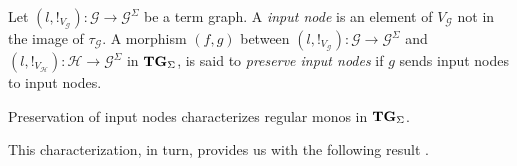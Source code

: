 \documentclass[3p]{elsarticle}
\newcommand{\catname}[1]{\textbf{\textup{#1}}}
\newcommand{\hyp}{\catname{Hyp}}
\newcommand{\tg}[0]{\catname{TG}_{\Sigma}}
\newcommand{\commentato}[1]{ {} }
\theoremstyle{remark}
\theoremstyle{definition}
\begin{document}
\begin{defi}
	Let $(l, !_{V_{\mathcal{G}}})\colon \mathcal{G}\to \mathcal{G}^{\Sigma}$  be a term graph. A \emph{input node} is an element of $V_{\mathcal{G}}$ not in the image of $\tau_{\mathcal{G}}$.  A morphism $(f,g)$ between
	 $(l, !_{V_{\mathcal{G}}})\colon \mathcal{G}\to \mathcal{G}^{\Sigma}$ and $(l, !_{V_{\mathcal{H}}})\colon \mathcal{H}\to \mathcal{G}^{\Sigma}$ in $\tg$, is said to \emph{preserve input nodes} if $g$ sends input nodes to input nodes.
\end{defi}

\commentato{
\todo{Se questo remark sotto non serve nel pezzo sulle equivalenze possiamo toglierlo}
\begin{rem}\label{prop:image}
	Suppose that $(f,g)\colon (l, !_{V_{\mathcal{G}}})\to (l', !_{V_{\mathcal{H}}})$ preserves input nodes. Then  if $\tau_{\mathcal{H}}(h)=g(v)$ for some $v\in V_{\mathcal{G}}$ then $h$ belongs to the image of $f$. Indeed, by hypothesis $v$ must be in the image of $\tau_{\mathcal{G}}$ and so there exists $k$ such that $\tau_{\mathcal{G}}(k)=v$. But then $\tau_{\mathcal{H}}(f(k))=g(v)$ and we can conclude that $f(k)=h$.
\end{rem}
}

Preservation of input nodes characterizes regular monos in $\tg$.


This characterization, in turn, provides us with the following result \cite{CastelnovoGM24,castelnovo2023thesis}. 

\end{document}
